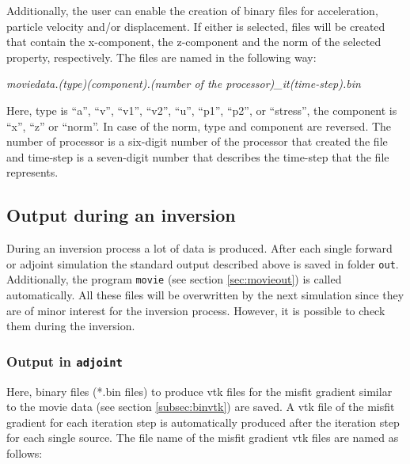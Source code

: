 			\medskip
			
			\medskip
			Additionally, the user can enable the creation of binary files for acceleration, particle velocity and/or displacement. If either is selected, files will be created that contain the x-component, the z-component and the norm of the selected property, respectively. The files are named in the following way:
			\begin{center}%
				\emph{moviedata.(type)(component).(number of the processor)\_it(time-step).bin}
			\end{center} 
			Here, type is ``a'', ``v'', ``v1'', ``v2'', ``u'', ``p1'', ``p2'', or ``stress'', the component is ``x'', ``z'' or ``norm''. In case of the norm, type and component are reversed. The number of processor is a six-digit number of the processor that created the file and time-step is a seven-digit number that describes the time-step that the file represents.

			\medskip
			
		\subsection{Output during an inversion}
		\label{subsec:outinv}
		
		During an inversion process a lot of data is produced. After each single forward or adjoint simulation the standard output described above is saved in folder \texttt{out}. Additionally, the program \texttt{movie} (see section \ref{sec:movieout}) is called automatically. All these files will be overwritten by the next simulation since they are of minor interest for the inversion process. However, it is possible to check them during the inversion.  
		
		\subsubsection{Output in \texttt{adjoint}}
			Here, binary files (*.bin files) to produce vtk files for the misfit gradient similar to the movie data (see section \ref{subsec:binvtk}) are saved. A vtk file of the misfit gradient for each iteration step is automatically produced after the iteration step for each single source. The file name of the misfit gradient vtk files are named as follows: 
		
